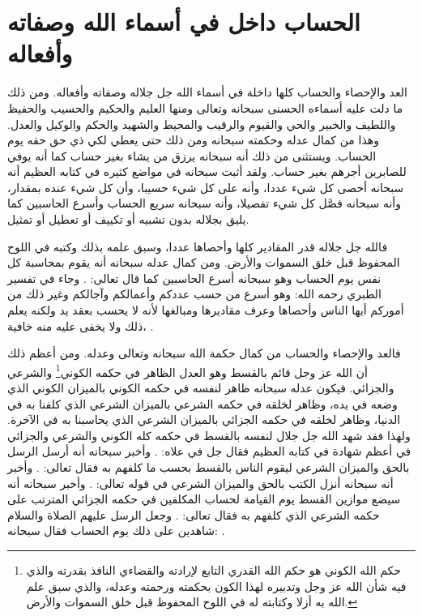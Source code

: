 \section{الحساب داخل في أسماء الله وصفاته وأفعاله}

العد والإحصاء والحساب كلها داخلة في أسماء الله جل جلاله وصفاته وأفعاله. ومن ذلك ما دلت عليه أسماءه الحسنى سبحانه وتعالى ومنها العليم والحكيم والحسيب والحفيظ واللطيف والخبير والحي والقيوم والرقيب والمحيط والشهيد والحكم والوكيل والعدل. وهذا من كمال عدله وحكمته سبحانه ومن ذلك حتى يعطي لكي ذي حق حقه يوم الحساب. ويستثنى من ذلك أنه سبحانه يرزق من يشاء بغير حساب كما أنه يوفي للصابرين أجرهم بغير حساب. ولقد أثبت سبحانه في مواضع كثيره في كتابه العظيم أنه سبحانه أحصى كل شيء عددا، وأنه على كل شيء حسيبا، وأن كل شيء عنده بمقدار، وأنه سبحانه فصَّل كل شيء تفصيلا، وأنه سبحانه سريع الحساب وأسرع الحاسبين كما يليق بجلاله بدون تشبيه أو تكييف أو تعطيل أو تمثيل. 

فالله جل جلاله قدر المقادير كلها وأحصاها عددا، وسبق علمه بذلك وكتبه في اللوح المحفوظ قبل خلق السموات والأرض. ومن كمال عدله سبحانه أنه يقوم بمحاسبة كل نفس يوم الحساب وهو سبحانه أسرع الحاسبين كما قال تعالى: \quranayah*[6][62]{\footnotesize \surahname*[6]}. وجاء في تفسير الطبري رحمه الله: وهو أسرع من حسب عددكم وأعمالكم وآجالكم وغير ذلك من أموركم أيها الناس وأحصاها وعرف مقاديرها ومبالغها لأنه لا يحسب بعقد يد ولكنه يعلم ذلك ولا يخفى عليه منه خافية، \quranayah*[34][3][13]{\footnotesize \surahname*[34]} \href{https://shamela.ws/book/7798/6327#p1}{\faExternalLink} \cite{tafsir_Tabari}.

فالعد والإحصاء والحساب من كمال حكمة الله سبحانه وتعالى وعدله. ومن أعظم ذلك أن الله عز وجل قائم بالقسط وهو العدل الظاهر في حكمه الكوني\footnote{حكم الله الكوني هو حكم الله القدري التابع لإرادته والقضاءي النافذ بقدرته والذي فيه شأن الله عز وجل وتدبيره لهذا الكون بحكمته ورحمته وعدله، والذي سبق علم الله به أزلا وكتابته له في اللوح المحفوظ قبل خلق السموات والأرض.} والشرعي والجزائي. فيكون عدله سبحانه ظاهر لنفسه في حكمه الكوني بالميزان الكوني الذي وضعه في يده، وظاهر لخلقه في حكمه الشرعي بالميزان الشرعي الذي كلفنا به في الدنيا، وظاهر لخلقه في حكمه الجزائي بالميزان الشرعي الذي يحاسبنا به في الآخرة. ولهذا فقد شهد الله جل جلال لنفسه بالقسط في حكمه كله الكوني والشرعي والجزائي في أعظم شهادة في كتابه العظيم فقال جل في علاه: \quranayah*[3][18]{\footnotesize \surahname*[3]}. وأخبر سبحانه أنه أرسل الرسل بالحق والميزان الشرعي ليقوم الناس بالقسط بحسب ما كلفهم به فقال تعالى: \quranayah*[57][25][1-11]{\footnotesize (\surahname*[57])}. وأخبر أنه سبحانه أنزل الكتب بالحق والميزان الشرعي في قوله تعالى: \quranayah*[42][17]{\footnotesize (\surahname*[42])}. وأخبر سبحانه أنه سيضع موازين القسط يوم القيامة لحساب المكلفين في حكمه الجزائي المترتب على حكمه الشرعي الذي كلفهم به فقال تعالى: \quranayah*[21][47]{\footnotesize \surahname*[21]}. وجعل الرسل عليهم الصلاة والسلام شاهدين على ذلك يوم الحساب فقال سبحانه: \quranayah*[10][47]{\footnotesize \surahname*[10]}.

